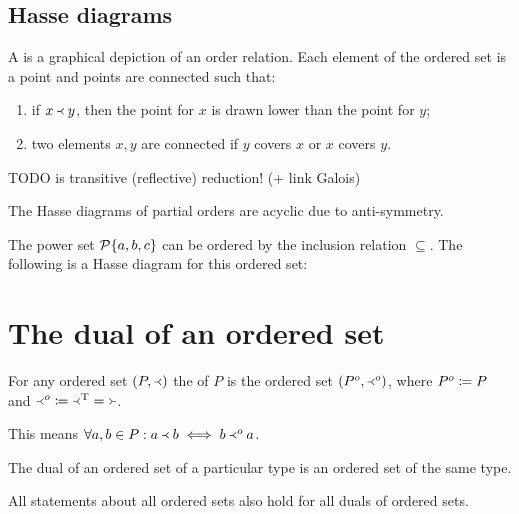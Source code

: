 \subsection{Hasse diagrams}
A  is a graphical depiction of an order relation. Each element of the ordered set is a point and points are connected such that:
\begin{enumerate}
\item if $x \Yleft y$, then the point for $x$ is drawn lower than the point for $y$;
\item two elements $x,y$ are connected if $y$ covers $x$ or $x$ covers $y$.
\end{enumerate}

TODO is transitive (reflective) reduction! (+ link Galois)

\begin{lemma}
The Hasse diagrams of partial orders are acyclic due to anti-symmetry.
\end{lemma}

\begin{example}
The power set $\operatorname{\mathcal{P}}\{a,b,c\}$ can be ordered by the inclusion relation $\subseteq$. The following is a Hasse diagram for this ordered set:
\begin{center}
\end{center}
\end{example}

\section{The dual of an ordered set}
\begin{definition}
For any ordered set $(P, \Yleft)$ the  of $P$ is the ordered set $(P^o, \Yleft^o)$, where $P^o \coloneqq P$ and $\Yleft^o \coloneqq \Yleft^{\mathrm{T}} = \Yright$.
\end{definition}
This means $\forall a,b\in P: a\Yleft b \iff b\Yleft^o a$.

\begin{lemma}
The dual of an ordered set of a particular type is an ordered set of the same type.
\end{lemma}
\begin{corollary}
All statements about all ordered sets also hold for all duals of ordered sets.
\end{corollary}

